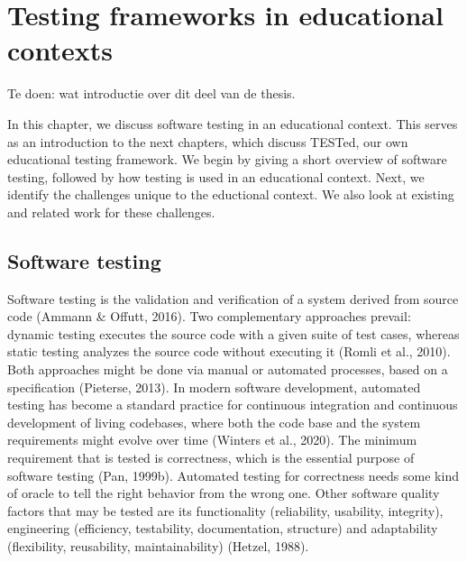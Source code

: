 \documentclass[../main]{subfiles}
\begin{document}
\chapter{Testing frameworks in educational contexts}
\label{ch:testing-frameworks-in-educational-contexts}

Te doen: wat introductie over dit deel van de thesis.

In this chapter, we discuss software testing in an educational context.
This serves as an introduction to the next chapters, which discuss TESTed, our own educational testing framework.
We begin by giving a short overview of software testing, followed by how testing is used in an educational context.
Next, we identify the challenges unique to the eductional context.
We also look at existing and related work for these challenges.

\section{Software testing}
\label{sec:software-testing}

Software testing is the validation and verification of a system derived from source code (Ammann \& Offutt, 2016).
Two complementary approaches prevail: dynamic testing executes the source code with a given suite of test cases, whereas static testing analyzes the source code without executing it (Romli et al., 2010). Both approaches might be done via manual or automated processes, based on a specification (Pieterse, 2013). In modern software development, automated testing has become a standard practice for continuous integration and continuous development of living codebases, where both the code base and the system requirements might evolve over time (Winters et al., 2020). The minimum requirement that is tested is correctness, which is the essential purpose of software testing (Pan, 1999b). Automated testing for correctness needs some kind of oracle to tell the right behavior from the wrong one. Other software quality factors that may be tested are its functionality (reliability, usability, integrity), engineering (efficiency, testability, documentation, structure) and adaptability (flexibility, reusability, maintainability) (Hetzel, 1988).
\end{document}
